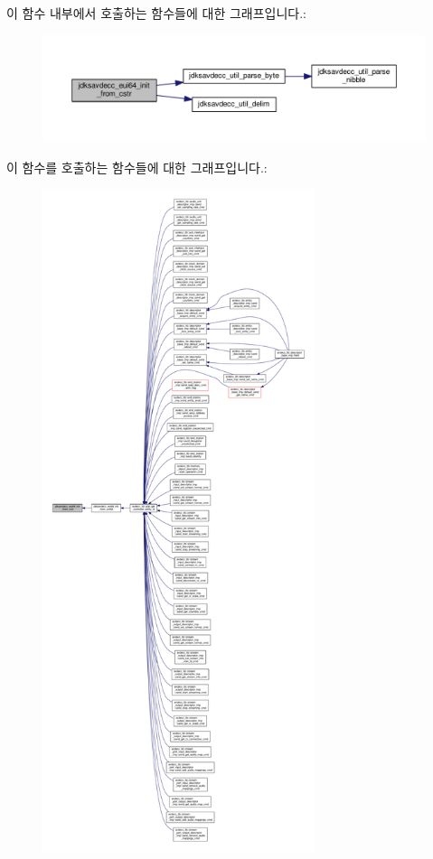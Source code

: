 이 함수 내부에서 호출하는 함수들에 대한 그래프입니다.\+:
\nopagebreak
\begin{figure}[H]
\begin{center}
\leavevmode
\includegraphics[width=350pt]{group__eui64_ga5331dac65cac162a295a9c4aaabed730_cgraph}
\end{center}
\end{figure}




이 함수를 호출하는 함수들에 대한 그래프입니다.\+:
\nopagebreak
\begin{figure}[H]
\begin{center}
\leavevmode
\includegraphics[height=550pt]{group__eui64_ga5331dac65cac162a295a9c4aaabed730_icgraph}
\end{center}
\end{figure}


